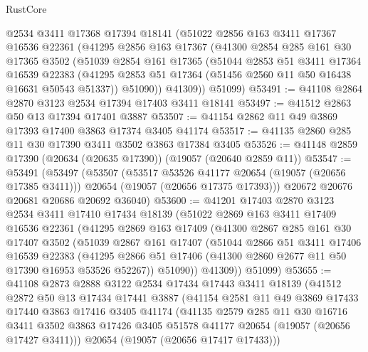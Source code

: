 \begin{lexlean}{RustCore}
\begin{coremodule}
    @2534
    @3411
    @17368
    @17394
    @18141
    (@51022
      @2856
      @163
      @3411
      @17367
      @16536
      @22361
      (@41295
        @2856
        @163
        @17367
        (@41300
          @2854
          @285
          @161
          @30
          @17365
          @3502
          (@51039
            @2854
            @161
            @17365
            (@51044
              @2853
              @51
              @3411
              @17364
              @16539
              @22383
              (@41295 @2853 @51 @17364 (@51456 @2560 @11 @50 @16438 @16631 @50543 @51337))
              @51090))
          @41309))
      @51099)
@53491 := @41108 @2864 @2870 @3123 @2534 @17394 @17403 @3411 @18141
@53497 := @41512 @2863 @50 @13 @17394 @17401 @3887
@53507 := @41154 @2862 @11 @49 @3869 @17393 @17400 @3863 @17374 @3405 @41174
@53517 := @41135 @2860 @285 @11 @30 @17390 @3411 @3502 @3863 @17384 @3405
@53526 := @41148 @2859 @17390 (@20634 (@20635 @17390)) (@19057 (@20640 @2859 @11))
@53547 := @53491
    (@53497
      (@53507
        (@53517 @53526 @41177 @20654 (@19057 (@20656 @17385 @3411)))
        @20654
        (@19057 (@20656 @17375 @17393)))
      @20672
      @20676
      @20681
      @20686
      @20692
      @36040)
@53600 := @41201
    @17403
    @2870
    @3123
    @2534
    @3411
    @17410
    @17434
    @18139
    (@51022
      @2869
      @163
      @3411
      @17409
      @16536
      @22361
      (@41295
        @2869
        @163
        @17409
        (@41300
          @2867
          @285
          @161
          @30
          @17407
          @3502
          (@51039
            @2867
            @161
            @17407
            (@51044
              @2866
              @51
              @3411
              @17406
              @16539
              @22383
              (@41295 @2866 @51 @17406 (@41300 @2860 @2677 @11 @50 @17390 @16953 @53526 @52267))
              @51090))
          @41309))
      @51099)
@53655 := @41108
    @2873
    @2888
    @3122
    @2534
    @17434
    @17443
    @3411
    @18139
    (@41512
      @2872
      @50
      @13
      @17434
      @17441
      @3887
      (@41154
        @2581
        @11
        @49
        @3869
        @17433
        @17440
        @3863
        @17416
        @3405
        @41174
        (@41135
          @2579
          @285
          @11
          @30
          @16716
          @3411
          @3502
          @3863
          @17426
          @3405
          @51578
          @41177
          @20654
          (@19057 (@20656 @17427 @3411)))
        @20654
        (@19057 (@20656 @17417 @17433)))

\end{coremodule}
\end{lexlean}
